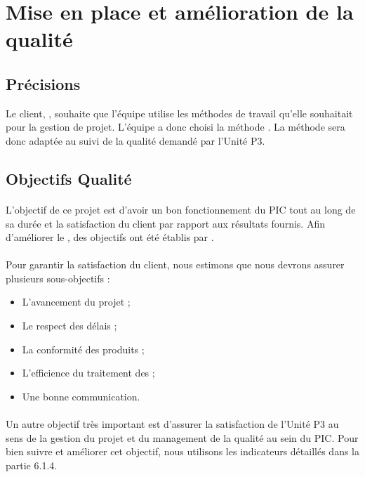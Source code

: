 \section{Mise en place et amélioration de la qualité}\label{qualite}

\subsection{Précisions}
Le client, \nomClient , souhaite que l’équipe \nomEquipe utilise les méthodes de travail qu'elle souhaitait pour
la gestion de projet. L'équipe a donc choisi la méthode \agile. La méthode \agile sera donc adaptée au suivi de la qualité demandé par l’Unité P3.

\subsection{Objectifs Qualité}
\paragraph*{} L’objectif de ce projet est d’avoir un bon fonctionnement du PIC tout au long de sa durée et la satisfaction du client par rapport aux résultats fournis. Afin d’améliorer le \SMQ , des objectifs ont été établis par \nomEquipe .
\paragraph*{} Pour garantir la satisfaction du client, nous estimons que nous devrons assurer plusieurs
sous-objectifs :
\begin{itemize} 
          \item L’avancement du projet ;
          \item Le respect des délais ;
          \item La conformité des produits ;
	\item L’efficience du traitement des \FT ;
	\item Une bonne communication.
	
 \end{itemize}
\paragraph*{} Un autre objectif très important est d’assurer la satisfaction de l’Unité P3 au sens de
la gestion du projet et du management de la qualité au sein du PIC. Pour bien suivre et
améliorer cet objectif, nous utilisons les indicateurs détaillés dans la partie 6.1.4.


